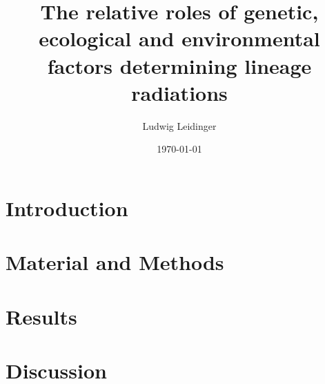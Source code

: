 \documentclass[a4paper]{scrartcl}
\title{The relative roles of genetic, ecological and environmental factors determining lineage radiations}
\author{Ludwig Leidinger}
\date{\today}
\begin{document}
\maketitle

\begin{abstract}

\end{abstract}

\section{Introduction}

\section{Material and Methods}

\section{Results}

\section{Discussion}


\printbibliography
\end{document}
